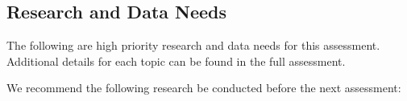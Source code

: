 \documentclass[11pt,
  english,
]{article}
\begin{document}
\FloatBarrier


\hypertarget{research-and-data-needs}{%
\subsection*{Research and Data Needs}\label{research-and-data-needs}}

\leavevmode\tagmcend\tagstructend

The following are high priority research and data needs for this assessment. Additional details for each topic can be found in the full assessment.

We recommend the following research be conducted before the next assessment:

\end{document}
